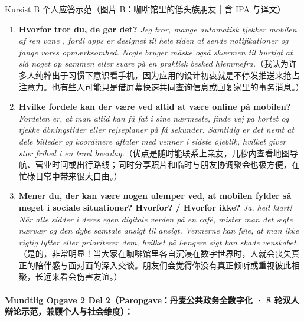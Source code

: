 \begin{grammatikbox}{Kursist B 个人应答示范（图片 B：咖啡馆里的低头族朋友｜含 IPA 与译文）}
\small
\begin{enumerate}
  \item \textbf{Hvorfor tror du, de gør det?} \textit{Jeg tror, mange automatisk tjekker mobilen af ren vane , fordi apps er designet til hele tiden at sende notifikationer og fange vores opmærksomhed. Nogle bruger måske også skærmen til hurtigt at slå noget op sammen eller svare på en praktisk besked hjemmefra.}（我认为许多人纯粹出于习惯下意识看手机，因为应用的设计初衷就是不停发推送来抢占注意力。也有些人可能只是借屏幕快速共同查询信息或回复家里的事务消息。）
  \item \textbf{Hvilke fordele kan der være ved altid at være online på mobilen?} \textit{Fordelen er, at man altid kan få fat i sine nærmeste, finde vej på kortet og tjekke åbningstider eller rejseplaner på få sekunder. Samtidig er det nemt at dele billeder og koordinere  aftaler med venner i sidste øjeblik, hvilket giver stor frihed i en travl hverdag.}（优点是随时能联系上亲友，几秒内查看地图导航、营业时间或出行路线；同时分享照片和临时与朋友协调聚会也极方便，在忙碌日常中带来很大自由。）
  \item \textbf{Mener du, der kan være nogen ulemper ved, at mobilen fylder så meget i sociale situationer? Hvorfor? / Hvorfor ikke?} \textit{Ja, helt klart! Når alle sidder i deres egen digitale verden på en café, mister man det ægte nærvær  og den dybe samtale ansigt til ansigt. Vennerne kan føle, at man ikke rigtig lytter eller prioriterer dem, hvilket på længere sigt kan skade venskabet.}（是的，非常明显！当大家在咖啡馆里各自沉浸在数字世界时，人就会丧失真正的陪伴感与面对面的深入交谈。朋友们会觉得你没有真正倾听或重视彼此相聚，长远来看会伤害友谊。）
\end{enumerate}
\end{grammatikbox}

\clearpage
\paragraph*{Mundtlig Opgave 2 Del 2（Paropgave：丹麦公共政务全数字化 · 8 轮双人辩论示范，兼顾个人与社会维度）：}


